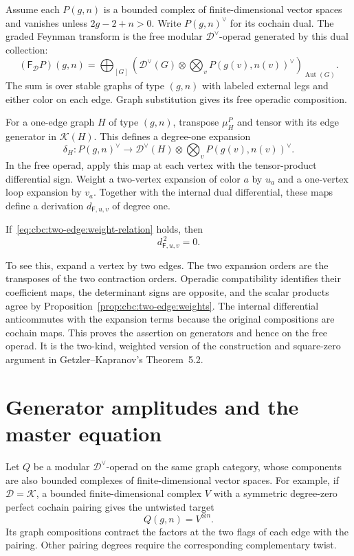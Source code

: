 Assume each $P(g,n)$ is a bounded complex of finite-dimensional vector spaces and vanishes unless $2g-2+n>0$.
Write $P(g,n)^\vee$ for its cochain dual.
The graded Feynman transform is the free modular $\mathcal D^\vee$-operad generated by this dual collection:
\begin{equation}\label{eq:cbc:two-edge:free-transform}
 (\mathsf F_{\mathcal D}P)(g,n)
 =\bigoplus_{[G]}
 \left(\mathcal D^\vee(G)\otimes
       \bigotimes_vP(g(v),n(v))^\vee\right)_{\operatorname{Aut}(G)}.
\end{equation}
The sum is over stable graphs of type $(g,n)$ with labeled external legs and either color on each edge.
Graph substitution gives its free operadic composition.

For a one-edge graph $H$ of type $(g,n)$, transpose $\mu_H^P$ and tensor with its edge generator in $\mathcal K(H)$.
This defines a degree-one expansion
\[
 \delta_H:P(g,n)^\vee\longrightarrow
 \mathcal D^\vee(H)\otimes
       \bigotimes_vP(g(v),n(v))^\vee.
\]
In the free operad, apply this map at each vertex with the tensor-product differential sign.
Weight a two-vertex expansion of color $a$ by $u_a$ and a one-vertex loop expansion by $v_a$.
Together with the internal dual differential, these maps define a derivation $d_{\mathsf F,u,v}$ of degree one.

If~\eqref{eq:cbc:two-edge:weight-relation} holds, then
\[
 d_{\mathsf F,u,v}^{\,2}=0.
\]

To see this, expand a vertex by two edges.
The two expansion orders are the transposes of the two contraction orders.
Operadic compatibility identifies their coefficient maps, the determinant signs are opposite, and the scalar products agree by Proposition~\ref{prop:cbc:two-edge:weights}.
The internal differential anticommutes with the expansion terms because the original compositions are cochain maps.
This proves the assertion on generators and hence on the free operad.
It is the two-kind, weighted version of the construction and square-zero argument in Getzler--Kapranov's Theorem~5.2.

\section{Generator amplitudes and the master equation}

Let $Q$ be a modular $\mathcal D^\vee$-operad on the same graph category, whose components are also bounded complexes of finite-dimensional vector spaces.
For example, if $\mathcal D=\mathcal K$, a bounded finite-dimensional complex $V$ with a symmetric degree-zero perfect cochain pairing gives the untwisted target
\[
 Q(g,n)=V^{\otimes n}.
\]
Its graph compositions contract the factors at the two flags of each edge with the pairing.
Other pairing degrees require the corresponding complementary twist.

